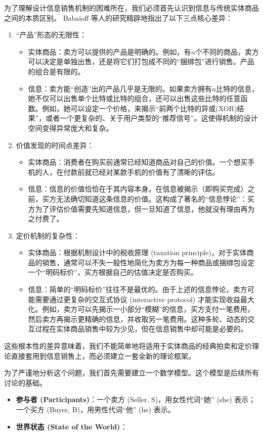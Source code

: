  为了理解设计信息销售机制的困难所在，我们必须首先认识到信息与传统实体商品之间的本质区别。
 Babaioff 等人的研究精辟地指出了以下三点核心差异：

 \begin{enumerate}
   \item “产品”形态的无限性：
      \begin{itemize}
        \item 实体商品：卖方可以提供的产品是明确的。例如，有$n$个不同的商品，卖方可以决定是单独出售，还是将它们打包成不同的“捆绑包”进行销售。产品的组合是有限的。
        \item 信息：卖方能“创造”出的产品几乎是无限的。如果卖方拥有$n$比特的信息，她不仅可以出售单个比特或比特的组合，还可以出售这些比特的任意函数。例如，她可以设定一个价格，来揭示“前两个比特的异或(XOR)结果”，或者一个更复杂的、关于用户类型的“推荐信号”。这使得机制的设计空间变得异常庞大和复杂。
      \end{itemize}
   \item 价值发现的时间点差异：
      \begin{itemize}
        \item 实体商品：消费者在购买前通常已经知道商品对自己的价值。一个想买手机的人，在付款前就已经对某款手机的价值有了清晰的评估。
        \item 信息：信息的价值恰恰在于其内容本身。在信息被揭示（即购买完成）之前，买方无法确切知道这条信息的价值。这构成了著名的“信息悖论”：买方为了评估价值需要先知道信息，但一旦知道了信息，他就没有理由再为之付费了。
      \end{itemize}
   \item 定价机制的复杂性：
      \begin{itemize}
        \item 实体商品：根据机制设计中的税收原理 (taxation principle)，对于实体商品的销售，通常可以不失一般性地简化为卖方为每一种商品或捆绑包设定一个“明码标价”，买方根据自己的估值决定是否购买。
        \item 信息：简单的“明码标价”往往不是最优的。由于上述的信息悖论，卖方可能需要通过更复杂的交互式协议 (interactive protocol) 才能实现收益最大化。例如，卖方可以先揭示一小部分“模糊”的信息，买方支付一笔费用，然后卖方再揭示更精确的信息，并收取另一笔费用。这种多轮、动态的交互过程在实体商品销售中较为少见，但在信息销售中却可能是必要的。
      \end{itemize}
 \end{enumerate}

 这些根本性的差异意味着，我们不能简单地将适用于实体商品的经典拍卖和定价理论直接套用到信息销售上，而必须建立一套全新的理论框架。

 为了严谨地分析这个问题，我们首先需要建立一个数学模型。这个模型是后续所有讨论的基础。

 \begin{itemize}
    \item \textbf{参与者 (Participants)}：一个卖方 (Seller, S)，用女性代词“她” (she) 表示；一个买方 (Buyer, B)，用男性代词“他” (he) 表示。
    \item \textbf{世界状态 (State of the World)}：
 \end{itemize}